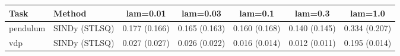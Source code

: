 \begin{tabular}{llccccc}\toprule
Task & Method & lam=0.01 & lam=0.03 & lam=0.1 & lam=0.3 & lam=1.0 \\\midrule
pendulum & SINDy (STLSQ) & 0.177 (0.166) & 0.165 (0.163) & 0.160 (0.168) & 0.140 (0.145) & 0.334 (0.207) \\
vdp & SINDy (STLSQ) & 0.027 (0.027) & 0.026 (0.022) & 0.016 (0.014) & 0.012 (0.011) & 0.195 (0.014) \\
\bottomrule\end{tabular}
